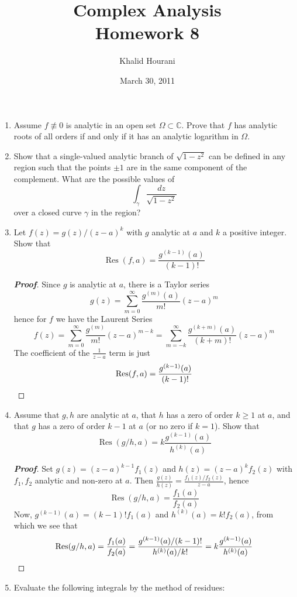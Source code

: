 \documentclass[12pt,leqno]{article}
\title{Complex Analysis\\\large Homework 8}
\date{March 30, 2011}
\author{Khalid Hourani}
\theoremstyle{definition}
\newcommand{\Res}{\operatorname{Res}}
\newcommand{\C}{\mathbb{C}}
\newenvironment{Proof}{\begin{proof}[\textnormal{\textbf{Proof}}]}{\end{proof}}
\begin{document}
 \begin{titlepage}
  \maketitle
 \end{titlepage}
\clearpage\mbox{}\clearpage

\setcounter{page}{1}
\begin{enumerate}
 \item Assume $f\not\equiv0$ is analytic in an open set $\Omega\subset\C$. Prove that $f$ has analytic roots of all orders if and only if it has an analytic logarithm in $\Omega.$
 \item Show that a single-valued analytic branch of $\sqrt{1-z^2}$ can be defined in any region such that the points $\pm1$ are in the same component of the complement. What are the possible values of \[\int_{\gamma}\frac{dz}{\sqrt{1-z^2}}\] over a closed curve $\gamma$ in the region?
 \item Let $f(z)=g(z)/(z-a)^k$ with $g$ analytic at $a$ and $k$ a positive integer. Show that \[\Res(f,a)=\frac{g^{(k-1)}(a)}{(k-1)!}\]
 	\begin{Proof}
 	Since $g$ is analytic at $a$, there is a Taylor series \[g(z)=\sum_{m=0}^{\infty}\frac{g^{(m)}(a)}{m!}(z-a)^m\] hence for $f$ we have the Laurent Series \[f(z)=\sum_{m=0}^{\infty}\frac{g^{(m)}}{m!}(z-a)^{m-k}=\sum_{m=-k}^{\infty}\frac{g^{(k+m)}(a)}{(k+m)!}(z-a)^{m}\] The coefficient of the $\frac{1}{z-a}$ term is just \[\Res(f,a)=\frac{g^{(k-1)}(a)}{(k-1)!}\qedhere\]
 	\end{Proof}
 \item Assume that $g,h$ are analytic at $a$, that $h$ has a zero of order $k\geq1$ at $a$, and that $g$ has a zero of order $k-1$ at $a$ (or no zero if $k=1$). Show that \[\Res(g/h,a)=k\frac{g^{(k-1)}(a)}{h^{(k)}(a)}\]
 	\begin{Proof}
  Set $g(z)=(z-a)^{k-1}f_1(z)$ and $h(z)=(z-a)^kf_2(z)$ with $f_1,f_2$ analytic and non-zero at $a$. Then $\frac{g(z)}{h(z)}=\frac{f_1(z)/f_2(z)}{z-a}$, hence \[\Res(g/h,a)=\frac{f_1(a)}{f_2(a)}\] Now, $g^{(k-1)}(a)=(k-1)!f_1(a)$ and $h^{(k)}(a)=k!f_2(a)$, from which we see that \[\Res(g/h,a)=\frac{f_1(a)}{f_2(a)}=\frac{g^{(k-1)}(a)/(k-1)!}{h^{(k)}(a)/k!}=k\frac{g^{(k-1)}(a)}{h^{(k)}(a)}\qedhere\]
 	\end{Proof}
 \item Evaluate the following integrals by the method of residues:


\end{enumerate}
\end{document}
